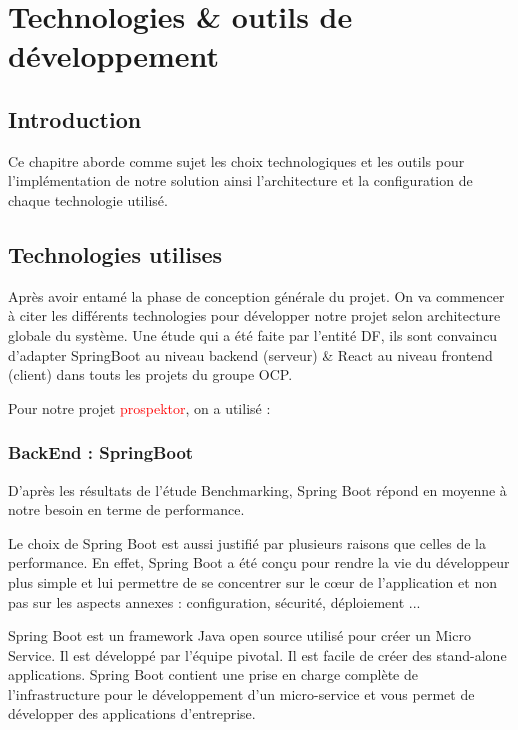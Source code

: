 \chapter{Technologies \& outils de d\'eveloppement}

\section{Introduction}

Ce chapitre aborde comme sujet les choix technologiques et les outils pour l'impl\'ementation de notre solution ainsi l'architecture et la configuration de chaque technologie utilis\'e.

\section{Technologies utilises}

Apr\`es avoir entam\'e la phase de conception g\'en\'erale du projet. On va commencer \`a citer  les diff\'erents technologies pour d\'evelopper notre projet selon architecture globale du syst\`eme. Une \'etude qui a \'et\'e faite par l'entit\'e \gls{DF}, ils sont convaincu d'adapter SpringBoot au niveau backend (serveur) \& React au niveau frontend (client) dans touts les projets du groupe \gls{OCP}.

Pour notre projet \textcolor{red}{prospektor}, on a utilis\'e :

\subsection{BackEnd : \textcolor{spring}{SpringBoot}}

D'apr\`es les r\'esultats de l'\'etude Benchmarking, Spring Boot r\'epond en moyenne \`a notre besoin en terme de performance.

Le choix de Spring Boot est aussi justifi\'e par plusieurs raisons que celles de la performance. En effet, Spring Boot a \'et\'e con\c{c}u pour rendre la vie du d\'eveloppeur plus simple et lui permettre de se concentrer sur le c\oe{}ur de l'application et non pas sur les aspects annexes : configuration, s\'ecurit\'e, d\'eploiement ...

Spring Boot est un framework Java open source utilis\'e pour cr\'eer un Micro Service. Il est d\'evelopp\'e par l'\'equipe pivotal. Il est facile de cr\'eer des stand-alone applications. Spring Boot contient une prise en charge compl\`ete de l'infrastructure pour le d\'eveloppement d'un micro-service et vous permet de d\'evelopper des applications d'entreprise.

